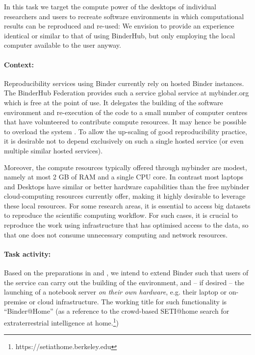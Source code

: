 \begin{task}[
  title=Binder@Home,
  id=binder-at-home,
  lead=SRL,
  PM=7,
  partners={MP,UIO, IFR}
]
In this task we target the compute power of the desktops of individual researchers and
users to recreate software environments in which computational results can be
reproduced and re-used: We envision to provide an experience identical or similar
to that of using BinderHub, but only employing the local computer available to the user anyway.

\paragraph*{Context:} Reproducibility services using Binder currently rely on hosted Binder instances.
The BinderHub Federation provides such a service global service at mybinder.org
which is free at
the point of use. It delegates the building of the software environment and
re-execution of the code to a small number of computer centres that have
volunteered to contribute compute resources.
It may hence be possible to overload the system .
To allow the up-scaling of good reproducibility practice, it is 
desirable not to depend exclusively on such a single hosted service (or even multiple similar hosted services).

Moreover, the compute resources typically offered through mybinder are modest, namely at most 2 GB of RAM
and a single CPU core.
In contrast most laptops and Desktops have similar or better hardware capabilities than
the free mybinder cloud-computing resources currently offer, making it highly desirable to leverage these local resources.
For some research areas, it is essential to access big datasets to reproduce the scientific computing workflow.
For such cases, it is crucial to reproduce the work using infrastructure that has optimised access to the data,
so that one does not consume unnecessary computing and network resources.  

\paragraph*{Task activity:} Based on the preparations in  and
, we intend to extend Binder such that users of the service can
carry out the building of the environment, and -- if desired -- the launching of a
notebook server \emph{on their own hardware}, e.g. their laptop or on-premise or cloud infrastructure.
The working title for such
functionality is ``Binder@Home'' (as a reference to the crowd-based SETI@home search for
extraterrestrial intelligence at home.\footnote{https://setiathome.berkeley.edu})


\end{task}
